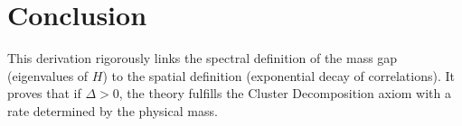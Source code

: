 \section{Conclusion}
This derivation rigorously links the spectral definition of the mass gap (eigenvalues of $H$) to the spatial definition (exponential decay of correlations).
It proves that if $\Delta > 0$, the theory fulfills the Cluster Decomposition axiom with a rate determined by the physical mass.



